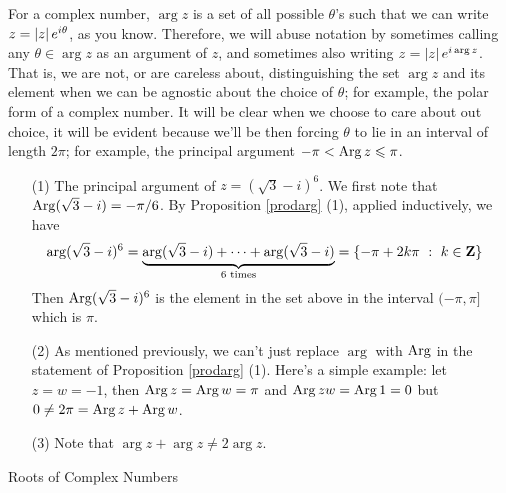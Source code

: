 \begin{remark}
For a complex number, $\arg z$ is a set of all possible $\theta$'s such that we can write $z = \left\lvert z\right\rvert e^{i\theta}$, as you know. Therefore, we will abuse notation by sometimes calling any $\theta \in \arg z$ as an argument of $z$, and sometimes also writing $z = \left\lvert z\right\rvert e^{i\arg z}$. That is, we are not, or are careless about, distinguishing the set $\arg z$ and its element when we can be agnostic about the choice of $\theta$; for example, the polar form of a complex number. It will be clear when we choose to care about out choice, it will be evident because we'll be then forcing $\theta$ to lie in an interval of length $2\pi$; for example, the principal argument $-\pi < \operatorname{Arg} z \leqslant \pi$.
\end{remark}

\vspace*{1em}

\begin{example}\hfill
\begin{itemize}
\item[(1)] The principal argument of $z = (\sqrt{3} - i)^6$. We first note that $\operatorname{Arg}(\sqrt{3} - i) = -\pi/6$. By Proposition \ref{prodarg} (1), applied inductively, we have
\begin{align*}
\arg (\sqrt{3} - i)^6 &= \underbrace{\arg(\sqrt{3} - i) + \cdots + \arg(\sqrt{3} - i)}_{\text{$6$ times}} = \left\{-\pi + 2k\pi\ :\ k \in \mathbf Z\right\}
\end{align*}
Then $\operatorname{Arg}(\sqrt{3} - i)^6$ is the element in the set above in the interval $(-\pi,\pi]$ which is $\pi$.
\item[(2)] As mentioned previously, we can't just replace $\arg$ with $\operatorname{Arg}$ in the statement of Proposition \ref{prodarg} (1). Here's a simple example: let $z = w = -1$, then $\operatorname{Arg} z = \operatorname{Arg} w = \pi$ and $\operatorname{Arg} zw = \operatorname{Arg} 1 = 0$ but $0 \neq 2\pi = \operatorname{Arg} z + \operatorname{Arg} w$.
\item[(3)] Note that $\arg z + \arg z \neq 2\arg z$.
\end{itemize}
\vspace*{-\baselineskip}
\end{example}


\begin{mdframed}
\begin{center}
{\Large Roots of Complex Numbers}
\end{center}
\end{mdframed}


